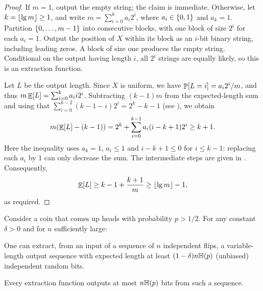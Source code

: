 \begin{proof}
    If $m=1$, output the empty string; the claim is immediate.
    Otherwise, let $k=\left\lfloor {\lg m} \right\rfloor\geq1$, and write
    $m=\sum_{i=0}^{k}a_i2^i$, where $a_i\in\left\{ {0,1} \right\}$ and $a_k=1$.
    Partition $\left\{ {0,\ldots,m-1} \right\}$ into consecutive blocks, with one
    block of size $2^i$ for each $a_i=1$. Output the position of $X$
    within its block as an $i$-bit binary string, including leading
    zeros. A block of size one produces the empty string.
    Conditional on the output having length $i$, all $2^i$ strings
    are equally likely, so this is an extraction function.

    Let $L$ be the output length. Since $X$ is uniform, we have
    $\Prob{L=i}=a_i2^i/m$, and thus
    $m\mathop{\mathbb{E}}\!\left[ {L} \right]=\sum_{i=0}^{k}a_i i2^i$.
    Subtracting $(k-1)m$ from the expected-length sum and using
    that $\sum_{i=0}^{k-2}(k-1-i)2^i=2^k-k-1$ (see
    ), we obtain
    \begin{equation}
        m\pth{\Ex{L}-(k-1)}
        =2^k+\sum_{i=0}^{k-1}a_i(i-k+1)2^i
        \geq k+1.
    \end{equation}%
    Here the inequality uses $a_k = 1$, $a_i\leq1$ and $i-k+1\leq0$ for
    $i\leq k-1$: replacing each $a_i$ by $1$ can only decrease the sum. The
    intermediate steps are given in . Consequently,
    \[
        \mathop{\mathbb{E}}\!\left[ {L} \right]\geq k-1+\frac{k+1}{m}\geq\left\lfloor {\lg m} \right\rfloor-1,
    \]
    as required.
\end{proof}

\begin{theorem}
    Consider a coin that comes up heads with probability $p >1/2$. For
    any constant $\delta >0$ and for $n$ sufficiently large:
    \begin{compactenumA}
        \item One can extract, from an input of a sequence of $n$
        independent flips, a variable-length output sequence with
        expected length at least $(1-\delta)n\Entropy{p}$ (unbiased)
        independent random bits.

        \smallskip%
        \item Every extraction function outputs at most $n \Entropy{p}$
        bits from such a sequence.
    \end{compactenumA}
\end{theorem}

